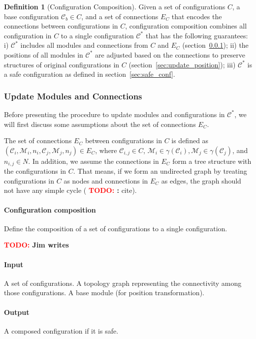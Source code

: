\documentclass[conference]{IEEEtran}
\theoremstyle{definition}
\newtheorem{definition}{Definition}[section]
\newcommand{\TODO}[1]{ {\bf \textcolor{red}{TODO:} #1 }}
\begin{document}
\begin{definition}[Configuration Composition] 
Given a set of configurations $C$, a base configuration $\mathcal{C}_b\in C$, and a set of connections $E_C$ that encodes the connections between configurations in $C$, configuration composition combines all configuration in $C$ to a single configuration $\mathcal{C}^*$ that has the following guarantees: i) $\mathcal{C}^*$ includes all modules and connections from $C$ and $E_C$ (section~\ref{sec:update_connection}); ii) the positions of all modules in $\mathcal{C}^*$ are adjusted based on the connections to preserve structures of original configurations in $C$ (section~\ref{sec:update_position}); iii) $\mathcal{C}^*$ is a safe configuration as defined in section~\ref{sec:safe_conf}. 
\end{definition}

\subsubsection{Update Modules and Connections} \label{sec:update_connection}
Before presenting the procedure to update modules and configurations in $\mathcal{C}^*$, we will first discuss some assumptions about the set of connections $E_C$.

The set of connections $E_C$ between configurations in $C$ is defined as $(\mathcal{C}_i, \mathcal{M}_i, n_i, \mathcal{C}_j, \mathcal{M}_j, n_j) \in E_C$, where $\mathcal{C}_{i,j}\in C$, $\mathcal{M}_i \in \gamma(\mathcal{C}_i), \mathcal{M}_j \in \gamma(\mathcal{C}_j)$, and $n_{i,j} \in N$. In addition, we assume the connections in $E_C$ form a tree structure with the configurations in $C$. That means, if we form an undirected graph by treating configurations in $C$ as nodes and connections in $E_C$ as edges, the graph should not have any simple cycle (\TODO: cite).

\paragraph{Configuration composition}
Define the composition of a set of configurations to a single configuration.

\TODO{Jim writes}
\paragraph{Input}
A set of configurations. A topology graph representing the connectivity among those configurations. A base module (for position transformation).
\paragraph{Output}
A composed configuration if it is safe.
\end{document}
